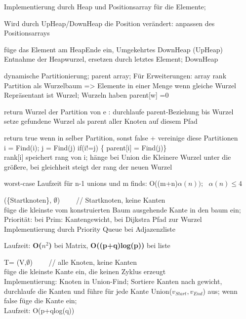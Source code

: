 Implementierung durch Heap und Positionsarray für die Elemente;

Wird durch UpHeap/DownHeap die Position verändert: anpassen des Positionsarrays

 füge das Element am HeapEnde ein, Umgekehrtes DownHeap (UpHeap) \\
 Entnahme der Heapwurzel, ersetzen durch letztes Element; DownHeap

dynamische Partitionierung; parent array; Für Erweiterungen: array rank\\
Partition als Wurzelbaum => Elemente in einer Menge wenn gleiche Wurzel\\
Repräsentant ist Wurzel; Wurzeln haben parent[w] =0

return Wurzel der Partition von e : durchlaufe parent-Beziehung bis Wurzel\\
 setze gefundene Wurzel als parent aller Knoten auf diesem Pfad 

return true wenn in selber Partition, sonst false + vereinige diese Partitionen\\
i = Find(i); j = Find(j) if(i!=j) \{ parent[i] = Find(j)\}\\
 rank[i] speichert rang von i; hänge bei Union die Kleinere Wurzel unter die größere, bei gleichheit steigt der rang der neuen Wurzel

worst-case Laufzeit für n-1 unions und m finds: O((m+n)$\alpha(n));~~~ \alpha(n) \leq 4$

 (\{Startknoten\}, $\emptyset$) ~~~~// Startknoten, keine Kanten\\
 füge die kleinste vom konstruierten Baum ausgehende Kante in den baum ein;\\
Priorität: bei Prim: Kantengewicht, bei Dijkstra Pfad zur Wurzel\\
Implementierung durch Priority Queue bei Adjazenzliste

Laufzeit: \textbf{O($n^2$)} bei Matrix, \textbf{O((p+q)log(p))} bei liste

 T= (V,$\emptyset$) ~~~~// alle Knoten, keine Kanten\\
 füge die kleinste Kante ein, die keinen Zyklus erzeugt\\
Implementierung: Knoten in Union-Find; Sortiere Kanten nach gewicht, durchlaufe die Kanten und führe für jede Kante Union($v_{Start},v_{End}$) aus; wenn false füge die Kante ein;\\
Laufzeit: O(p+qlog(q))


